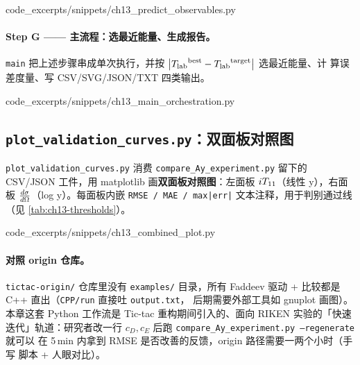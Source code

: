 
  {code_excerpts/snippets/ch13_predict_observables.py}

\paragraph{Step G —— 主流程：选最近能量、生成报告。}
\texttt{main} 把上述步骤串成单次执行，并按
\(\big|{T_{\text{lab}}}^{\text{best}} - {T_{\text{lab}}}^{\text{target}}\big|\) 选最近能量、计
算误差度量、写 CSV/SVG/JSON/TXT 四类输出。


  {code_excerpts/snippets/ch13_main_orchestration.py}

\subsection{\texttt{plot\_validation\_curves.py}：双面板对照图}
\label{subsec:ch13-code-plot}

\texttt{plot\_validation\_curves.py} 消费 \texttt{compare\_Ay\_experiment.py}
留下的 CSV/JSON 工件，用 matplotlib 画\textbf{双面板对照图}：左面板
\({i T_{11}}\)（线性 y），右面板 \(\frac{d\sigma}{d\Omega}\)（log y）。每面板内嵌
\texttt{RMSE / MAE / max|err|} 文本注释，用于判别通过线（见
\cref{tab:ch13-thresholds}）。


  {code_excerpts/snippets/ch13_combined_plot.py}

\paragraph{对照 origin 仓库。}
\texttt{tictac-origin/} 仓库里没有 \texttt{examples/} 目录，所有 Faddeev
驱动 + 比较都是 C++ 直出（\texttt{CPP/run} 直接吐 \texttt{output.txt}，
后期需要外部工具如 gnuplot 画图）。本章这套 Python 工作流是 Tic-tac
重构期间引入的、面向 RIKEN 实验的「快速迭代」轨道：研究者改一行
\(c_D, c_E\) 后跑 \texttt{compare\_Ay\_experiment.py --regenerate} 就可以
在 5\,min 内拿到 RMSE 是否改善的反馈，origin 路径需要一两个小时（手写
脚本 + 人眼对比）。

